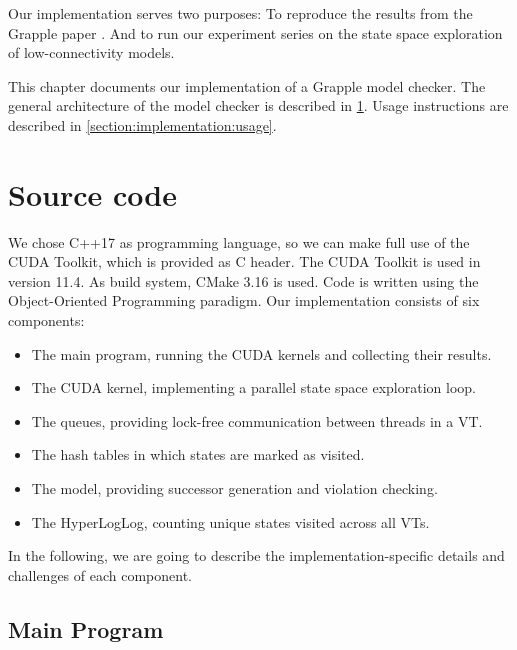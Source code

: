 \documentclass[
fancyheadings, %
%
%
]{stsreprt}
\begin{document}
Our implementation serves two purposes:
To reproduce the results from the Grapple paper \cite{DeFrancisco2020.Grapple}.
And to run our experiment series on the state space exploration of low-connectivity models.

This chapter documents our implementation of a Grapple model checker.
The general architecture of the model checker is described in \cref{section:implementation:source-code}.
Usage instructions are described in \cref{section:implementation:usage}.

\section{Source code}
\label{section:implementation:source-code}

We chose C++17 as programming language, so we can make full use of the CUDA Toolkit, which is provided as C header.
The CUDA Toolkit is used in version 11.4.
As build system, CMake 3.16 is used.
Code is written using the Object-Oriented Programming paradigm.
Our implementation consists of six components:

\begin{itemize}
    \item The main program, running the CUDA kernels and collecting their results.
    \item The CUDA kernel, implementing a parallel state space exploration loop.
    \item The queues, providing lock-free communication between threads in a VT.
    \item The hash tables in which states are marked as visited.
    \item The model, providing successor generation and violation checking.
    \item The HyperLogLog, counting unique states visited across all VTs.
\end{itemize}


In the following, we are going to describe the implementation-specific details and challenges of each component.

\subsection{Main Program}
\end{document}
